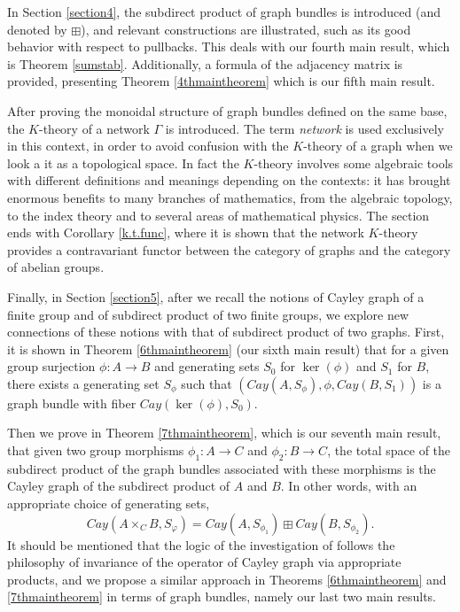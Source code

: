 \documentclass{amsart}
\theoremstyle{definition}
\numberwithin{equation}{section}
\begin{document}
In Section \ref{section4}, the subdirect product of graph bundles is introduced (and denoted by $\boxplus$), and relevant constructions  are illustrated, such as its good behavior with respect to pullbacks. This deals with our fourth main result, which is Theorem \ref{sumstab}. Additionally, a formula of the adjacency matrix is provided, presenting Theorem \ref{4thmaintheorem} which is our fifth main result. 


After proving the monoidal structure of graph bundles defined on the same base, the $K$-theory of a network $\Gamma$ is introduced. The term \textit{network} is used exclusively in this context, in order to avoid confusion with  the $K$-theory of a graph when we look a it  as a topological space. In fact the $K$-theory involves some algebraic tools with different definitions and meanings depending on the contexts: it has brought enormous benefits to many branches of mathematics, from the algebraic topology, to the index theory and  to several areas of mathematical physics. The section ends with Corollary \ref{k.t.func}, where it is shown that the network $K$-theory provides a contravariant functor between the category of graphs and the category of abelian groups.
 
Finally, in Section \ref{section5}, after  we recall the notions of  Cayley graph of a finite group and  of  subdirect product of two finite groups, we explore new connections of these notions with that of  subdirect product of  two graphs. First, it is shown in Theorem \ref{6thmaintheorem} (our sixth main result) that for a given  group surjection $\phi: A \longrightarrow B$ and  generating sets $S_0$ for $\ker(\phi)$ and $S_1$ for $B$, there exists a generating set $S_\phi$ such that $(Cay(A, S_\phi), \phi, Cay(B, S_1))$ is a graph bundle with fiber $Cay(\ker(\phi), S_0)$. 

Then we prove in Theorem \ref{7thmaintheorem}, which is our seventh  main result, that given two group morphisms $\phi_1: A \longrightarrow C$ and $\phi_2: B \longrightarrow C$, the total space of the subdirect product of the graph bundles associated with these morphisms is the Cayley graph of the subdirect product of $A$ and $B$. In other words, with an appropriate choice of generating sets,
\begin{equation} Cay(A \times_C B, S_{\varphi}) = Cay(A, S_{\phi_1}) \boxplus Cay(B, S_{\phi_2}). \end{equation}
It should be mentioned that the logic of the investigation of \cite[Theorems 3.6]{bddr} follows the philosophy of invariance of the operator of Cayley graph via appropriate products, and we propose a similar approach in Theorems \ref{6thmaintheorem} and \ref{7thmaintheorem} in terms of graph bundles, namely our last two main results.
\end{document}
